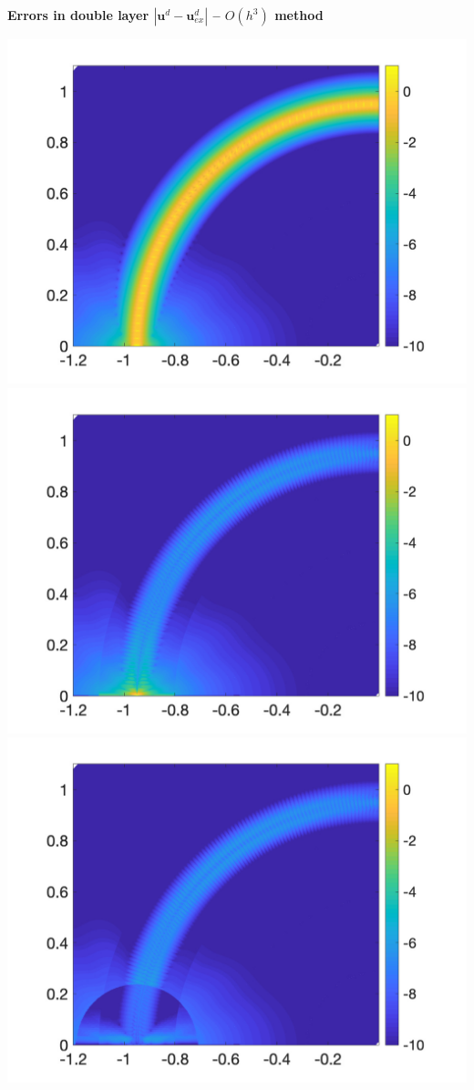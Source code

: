  

\centerline{\textbf{\Large Errors in double layer $|\mathbf{u}^d-\mathbf{u}^d_{ex}|$ -- $O(h^3)$ method}}
\bigskip
\noindent
\includegraphics[trim=40 20 40 10, clip, width=2.5truein]{figs/fig100a3} 
\includegraphics[trim=40 20 40 10, clip, width=2.5truein]{figs/fig100b3} 
\includegraphics[trim=40 20 40 10, clip, width=2.5truein]{figs/fig100c3} \\
